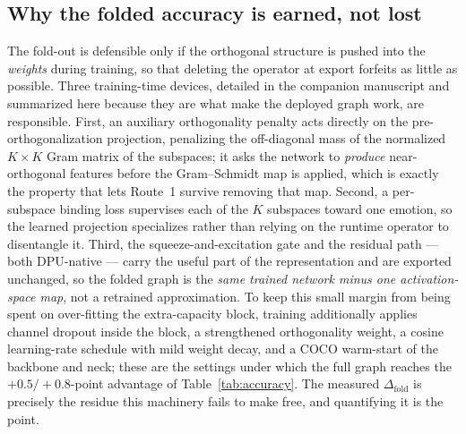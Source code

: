 \documentclass[onecolumn,journal]{IEEEtran}
\begin{document}
\subsection{Why the folded accuracy is earned, not lost}\label{sec:provenance}
The fold-out is defensible only if the orthogonal structure is pushed into the
\emph{weights} during training, so that deleting the operator at export forfeits as
little as possible. Three training-time devices, detailed in the companion manuscript
\cite{askri2026fleo} and summarized here because they are what make the deployed graph
work, are responsible. First, an auxiliary orthogonality penalty acts directly on the
pre-orthogonalization projection, penalizing the off-diagonal mass of the normalized
$K{\times}K$ Gram matrix of the subspaces; it asks the network to \emph{produce}
near-orthogonal features before the Gram--Schmidt map is applied, which is exactly the
property that lets Route~1 survive removing that map. Second, a per-subspace binding
loss supervises each of the $K$ subspaces toward one emotion, so the learned projection
specializes rather than relying on the runtime operator to disentangle it. Third, the
squeeze-and-excitation gate and the residual path --- both DPU-native --- carry the
useful part of the representation and are exported unchanged, so the folded graph is the
\emph{same trained network minus one activation-space map}, not a retrained
approximation. To keep this small margin from being spent on over-fitting the
extra-capacity block, training additionally applies channel dropout inside the block, a
strengthened orthogonality weight, a cosine learning-rate schedule with mild weight
decay, and a COCO warm-start of the backbone and neck; these are the settings under
which the full graph reaches the $+0.5/+0.8$-point advantage of
Table~\ref{tab:accuracy}. The measured $\Delta_{\mathrm{fold}}$ is precisely the residue
this machinery fails to make free, and quantifying it is the point.
\end{document}

